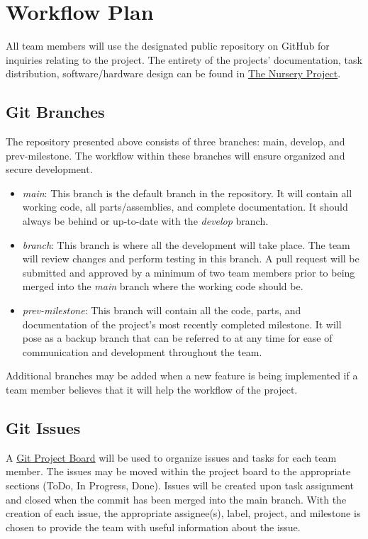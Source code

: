 \documentclass{article}
\begin{document}
	\section{Workflow Plan}
	All team members will use the designated public repository on GitHub 
	for inquiries relating to the project. The entirety of the projects’ 
	documentation, task distribution, software/hardware design can be found 
	in \href{https://github.com/aaronbilly22/The_Nursery_Project}{The Nursery Project}.
	
	\subsection{Git Branches}
	The repository presented above consists of three branches: main, develop, and prev-milestone. 
	The workflow within these branches will ensure organized and secure development.
	\begin{itemize}
		\item \emph{main}: This branch is the default branch in the repository. It will contain all working code, all parts/assemblies, and complete documentation. 
		It should always be behind or up-to-date with the \emph{develop} branch.
		\item \emph{branch}: This branch is where all the development will take place.
		 The team will review changes and perform testing in this branch. A pull request 
		 will be submitted and approved by a minimum of two team members prior to being 
		 merged into the \emph{main} branch where the working code should be.
		\item \emph{prev-milestone}: This branch will contain all the code, parts, and documentation 
		of the project’s most recently completed milestone. It will pose as a 
		backup branch that can be referred to at any time for ease of communication and 
		development throughout the team.
	\end{itemize}
	Additional branches may be added when a new feature is being implemented if a 
	team member believes that it will help the workflow of the project.

	\subsection{Git Issues}
	A \href{https://github.com/users/aaronbilly22/projects/1}{Git Project Board} will be used to organize 
	issues and tasks for each team member. The issues may be moved within the project board to the 
	appropriate sections (ToDo, In Progress, Done). Issues will be created upon task assignment and closed 
	when the commit has been merged into the main branch. With the creation of each issue, the appropriate assignee(s), label, project, and milestone is chosen
	to provide the team with useful information about the issue.\\
\end{document}
